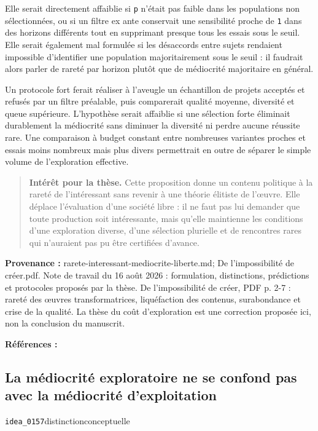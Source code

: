 \documentclass[10pt,a4paper]{article}
\begin{document}
Elle serait directement affaiblie si \texttt{p} n'était pas faible dans les populations non sélectionnées, ou si un filtre ex ante conservait une sensibilité proche de \texttt{1} dans des horizons différents tout en supprimant presque tous les essais sous le seuil. Elle serait également mal formulée si les désaccords entre sujets rendaient impossible d'identifier une population majoritairement sous le seuil : il faudrait alors parler de rareté par horizon plutôt que de médiocrité majoritaire en général.

Un protocole fort ferait réaliser à l'aveugle un échantillon de projets acceptés et refusés par un filtre préalable, puis comparerait qualité moyenne, diversité et queue supérieure. L'hypothèse serait affaiblie si une sélection forte éliminait durablement la médiocrité sans diminuer la diversité ni perdre aucune réussite rare. Une comparaison à budget constant entre nombreuses variantes proches et essais moins nombreux mais plus divers permettrait en outre de séparer le simple volume de l'exploration effective.

\begin{quote}
\textbf{Intérêt pour la thèse.} Cette proposition donne un contenu politique à la rareté de l'intéressant sans revenir à une théorie élitiste de l'œuvre. Elle déplace l'évaluation d'une société libre : il ne faut pas lui demander que toute production soit intéressante, mais qu'elle maintienne les conditions d'une exploration diverse, d'une sélection plurielle et de rencontres rares qui n'auraient pas pu être certifiées d'avance.
\end{quote}
{\footnotesize\color{metadata}\textbf{Provenance :} rarete-interessant-mediocrite-liberte.md; De l'impossibilité de créer.pdf. Note de travail du 16 août 2026 : formulation, distinctions, prédictions et protocoles proposés par la thèse. De l'impossibilité de créer, PDF p. 2-7 : rareté des œuvres transformatrices, liquéfaction des contenus, surabondance et crise de la qualité. La thèse du coût d'exploration est une correction proposée ici, non la conclusion du manuscrit.\par}
{\footnotesize\color{metadata}\textbf{Références :} \parencite{debord1967spectacle,muray2005festivus,stiegler2010pharmacologie,pachet2026impossibilite}\par}

\subsection{La médiocrité exploratoire ne se confond pas avec la médiocrité d'exploitation}
{\small\color{metadata} \texttt{idea\_0157}\quad\textbullet\quad distinction\quad\textbullet\quad conceptuelle\par}
\end{document}
